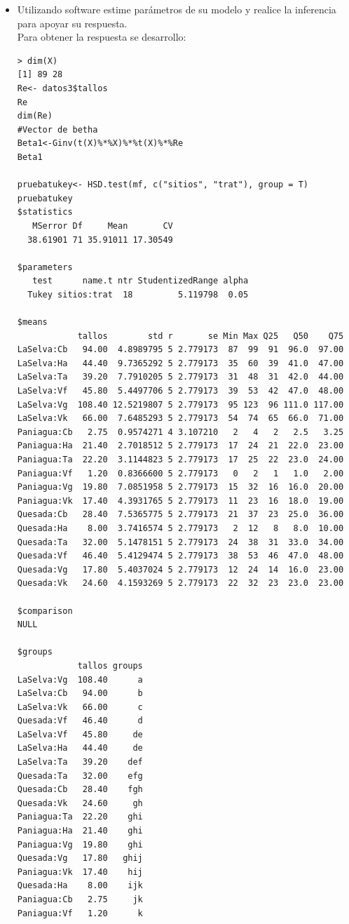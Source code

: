 \documentclass[12pt,a4paper]{report}
\begin{document}
\begin{enumerate}
\begin{itemize}
\item[b)]Utilizando software estime parámetros de su modelo y realice la inferencia para apoyar su respuesta.\\
Para obtener la respuesta se desarrollo: 
\begin{verbatim}
> dim(X)
[1] 89 28
Re<- datos3$tallos
Re
dim(Re)
#Vector de betha
Beta1<-Ginv(t(X)%*%X)%*%t(X)%*%Re
Beta1

pruebatukey<- HSD.test(mf, c("sitios", "trat"), group = T)
pruebatukey
$statistics
   MSerror Df     Mean       CV
  38.61901 71 35.91011 17.30549

$parameters
   test      name.t ntr StudentizedRange alpha
  Tukey sitios:trat  18         5.119798  0.05

$means
            tallos        std r       se Min Max Q25   Q50    Q75
LaSelva:Cb   94.00  4.8989795 5 2.779173  87  99  91  96.0  97.00
LaSelva:Ha   44.40  9.7365292 5 2.779173  35  60  39  41.0  47.00
LaSelva:Ta   39.20  7.7910205 5 2.779173  31  48  31  42.0  44.00
LaSelva:Vf   45.80  5.4497706 5 2.779173  39  53  42  47.0  48.00
LaSelva:Vg  108.40 12.5219807 5 2.779173  95 123  96 111.0 117.00
LaSelva:Vk   66.00  7.6485293 5 2.779173  54  74  65  66.0  71.00
Paniagua:Cb   2.75  0.9574271 4 3.107210   2   4   2   2.5   3.25
Paniagua:Ha  21.40  2.7018512 5 2.779173  17  24  21  22.0  23.00
Paniagua:Ta  22.20  3.1144823 5 2.779173  17  25  22  23.0  24.00
Paniagua:Vf   1.20  0.8366600 5 2.779173   0   2   1   1.0   2.00
Paniagua:Vg  19.80  7.0851958 5 2.779173  15  32  16  16.0  20.00
Paniagua:Vk  17.40  4.3931765 5 2.779173  11  23  16  18.0  19.00
Quesada:Cb   28.40  7.5365775 5 2.779173  21  37  23  25.0  36.00
Quesada:Ha    8.00  3.7416574 5 2.779173   2  12   8   8.0  10.00
Quesada:Ta   32.00  5.1478151 5 2.779173  24  38  31  33.0  34.00
Quesada:Vf   46.40  5.4129474 5 2.779173  38  53  46  47.0  48.00
Quesada:Vg   17.80  5.4037024 5 2.779173  12  24  14  16.0  23.00
Quesada:Vk   24.60  4.1593269 5 2.779173  22  32  23  23.0  23.00

$comparison
NULL

$groups
            tallos groups
LaSelva:Vg  108.40      a
LaSelva:Cb   94.00      b
LaSelva:Vk   66.00      c
Quesada:Vf   46.40      d
LaSelva:Vf   45.80     de
LaSelva:Ha   44.40     de
LaSelva:Ta   39.20    def
Quesada:Ta   32.00    efg
Quesada:Cb   28.40    fgh
Quesada:Vk   24.60     gh
Paniagua:Ta  22.20    ghi
Paniagua:Ha  21.40    ghi
Paniagua:Vg  19.80    ghi
Quesada:Vg   17.80   ghij
Paniagua:Vk  17.40    hij
Quesada:Ha    8.00    ijk
Paniagua:Cb   2.75     jk
Paniagua:Vf   1.20      k


\end{verbatim}
\end{itemize}
\end{enumerate}
\end{document}
